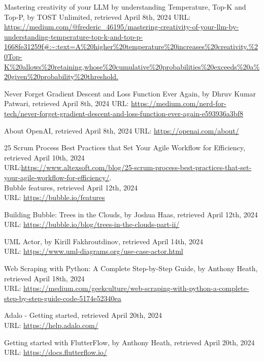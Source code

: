 \begin{thebibliography}{9}
Mastering creativity of your LLM by understanding Temperature, Top-K and Top-P, by TOST Unlimited, retrieved April 8th, 2024
URL: \url{https://medium.com/@frederic_46195/mastering-creativity-of-your-llm-by-understanding-temperature-top-k-and-top-p-1668fe31259f#:~:text=A%20higher%20temperature%20increases%20creativity.%20Top-K%20allows%20retaining,whose%20cumulative%20probabilities%20exceeds%20a%20given%20probability%20threshold.}

Never Forget Gradient Descent and Loss Function Ever Again, by Dhruv Kumar Patwari, retrieved April 8th, 2024
URL: \url{https://medium.com/nerd-for-tech/never-forget-gradient-descent-and-loss-function-ever-again-e593936a3bf8}

About OpenAI, retrieved April 8th, 2024
URL: \url{https://openai.com/about/}




25 Scrum Process Best Practices that Set Your Agile Workflow for Efficiency, retrieved April 10th, 2024 \\
URL:\url{https://www.altexsoft.com/blog/25-scrum-process-best-practices-that-set-your-agile-workflow-for-efficiency/}.\\

Bubble features, retrieved April 12th, 2024\\
URL: \url{https://bubble.io/features}


Building Bubble: Trees in the Clouds, by Joshua Haas, retrieved April 12th, 2024\\
URL: \url{https://bubble.io/blog/trees-in-the-clouds-part-ii/}

UML Actor, by Kirill Fakhroutdinov, retrieved April 14th, 2024\\
URL: \url{https://www.uml-diagrams.org/use-case-actor.html}


Web Scraping with Python: A Complete Step-by-Step Guide, by Anthony Heath, retrieved April 18th, 2024\\
URL: \url{https://medium.com/geekculture/web-scraping-with-python-a-complete-step-by-step-guide-code-5174e52340ea}


Adalo - Getting started, retrieved April 20th, 2024\\
URL: \url{https://help.adalo.com/}




Getting started with FlutterFlow, by Anthony Heath, retrieved April 20th, 2024\\
URL: \url{https://docs.flutterflow.io/}




\end{thebibliography}
